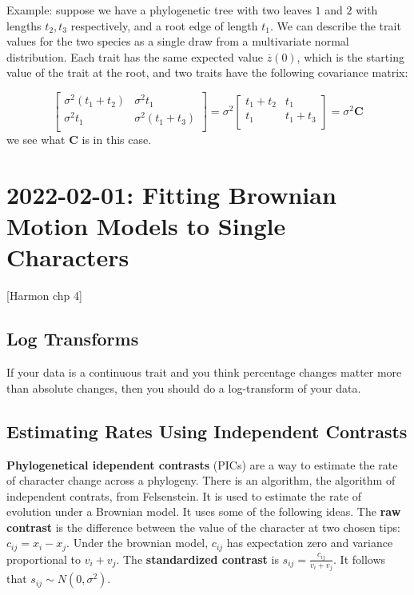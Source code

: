 \documentclass{article}
\begin{document}
Example: suppose we have a phylogenetic tree with two leaves $1$ and $2$ with
lengths $t_{2},t_{3}$ respectively, and a root edge of length $t_{1}$. We can
describe the trait values for the two species as a single draw from a
multivariate normal distribution. Each trait has the same expected value
$\overline{z}(0)$, which is the starting value of the trait at the root, and two
traits have the following covariance matrix:

\begin{equation*}
  \begin{bmatrix}
    \sigma^2 (t_1 + t_2) & \sigma^2 t_1 \\
    \sigma^2 t_1 & \sigma^2 (t_1 + t_3) \\
\end{bmatrix}
= \sigma^2
\begin{bmatrix}
    t_1 + t_2 & t_1 \\
    t_1 & t_1 + t_3 \\
\end{bmatrix} = \sigma^2 \mathbf{C}
\end{equation*}
we see what $\mathbf{C}$ is in this case.

\section{2022-02-01: Fitting Brownian Motion Models to Single Characters}
[Harmon chp 4]
\subsection{Log Transforms}
If your data is a continuous trait and you think percentage changes matter more
than absolute changes, then you should do a log-transform of your data.

\subsection{Estimating Rates Using Independent Contrasts}

\textbf{Phylogenetical idependent contrasts} (PICs) are a way to estimate the
rate of character change across a phylogeny. There is an algorithm, the
algorithm of independent contrats, from Felsenstein. It is used to estimate the
rate of evolution under a Brownian model. It uses some of the following ideas.
The \textbf{raw contrast} is the difference between the value of the character
at two chosen tips: $c_{ij} = x_{i}-x_{j}$. Under the brownian model, $c_{ij}$
has expectation zero and variance proportional to $v_{i}+v_{j}$. The
\textbf{standardized contrast} is $s_{ij} = \frac{c_{ij}}{v_{i}+v_{j}}$. It
follows that $s_{ij}\sim N(0,\sigma^{2})$.
\end{document}

